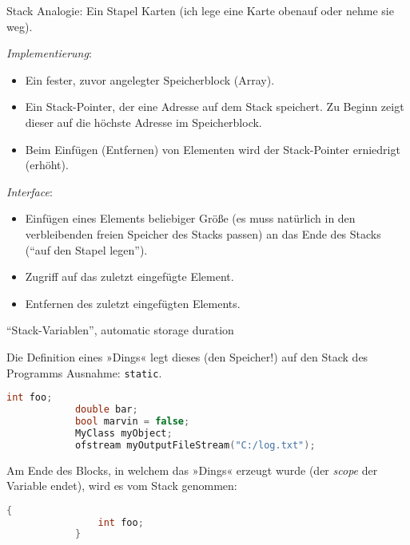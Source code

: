 \begin{frame}{Stack}
	Analogie: Ein Stapel Karten (ich lege eine Karte obenauf oder nehme sie weg).
	
	\hspace{1em}
	\pause
	
	\emph{Implementierung}:
	\begin{itemize}
		\item Ein fester, zuvor angelegter Speicherblock (Array).
		\item Ein Stack-Pointer, der eine Adresse auf dem Stack speichert. Zu Beginn zeigt dieser auf die höchste Adresse im Speicherblock.
		\item Beim Einfügen (Entfernen) von Elementen wird der Stack-Pointer erniedrigt (erhöht).
	\end{itemize}
	
	\pause
	
	\emph{Interface}:
	\begin{itemize}
		\item Einfügen eines Elements beliebiger Größe {\tiny(es muss natürlich in den verbleibenden freien Speicher des Stacks passen)} an das Ende des Stacks (\enquote{auf den Stapel legen}).
		\item Zugriff auf das zuletzt eingefügte Element.
		\item Entfernen des zuletzt eingefügten Elements.
	\end{itemize}
\end{frame}

\begin{frame}[fragile]{\enquote{Stack-Variablen}, automatic storage duration}
	\footnotesize

	Die Definition eines »Dings« legt dieses (den Speicher!) auf den Stack des Programms {\tiny Ausnahme: \verb|static|}.
	\begin{block}{}
		\begin{lstlisting}[language=C++]
			int foo;
			double bar;
			bool marvin = false;
			MyClass myObject;
			ofstream myOutputFileStream("C:/log.txt");
		\end{lstlisting}
	\end{block}
	
	\pause
	
	Am Ende des Blocks, in welchem das »Dings« erzeugt wurde (der \emph{scope} der Variable endet), wird es vom Stack genommen:
	\begin{block}{}
		\begin{lstlisting}[language=C++]
			{
			    int foo;
			}
		\end{lstlisting}
	\end{block}
\end{frame}

